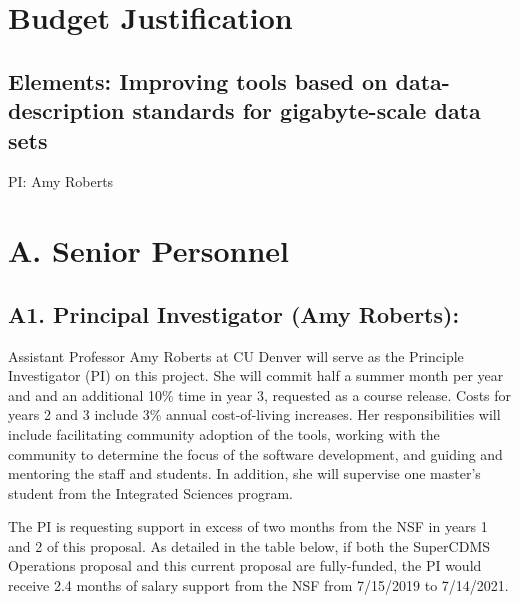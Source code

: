 \documentclass[11pt,oneside]{memoir}
\newcommand{\CDMS}{{\small CDMS}}
\begin{document}
\mainmatter
\pagestyle{bodystyle}

\section*{Budget Justification}
\subsection{Elements: Improving tools based on data-description standards for gigabyte-scale data sets}
\hspace{1cm}
\newline
PI: Amy Roberts


\section*{A. Senior Personnel}

\subsection*{A1. Principal Investigator (Amy Roberts):}

Assistant Professor Amy Roberts at CU Denver will serve as the Principle Investigator (PI) on this project.  She will commit half a summer month per year and and an additional 10\% time in year 3, requested as a course release. Costs for years 2 and 3 include 3\% annual cost-of-living increases. Her responsibilities will include facilitating community adoption of the tools, working with the community to determine the focus of the software development, and guiding and mentoring the staff and students.  In addition, she will supervise one master's student from the Integrated Sciences program.


The PI is requesting support in excess of two months from the NSF in years 1 and 2 of this proposal. As detailed in the table below, if both the SuperCDMS Operations proposal and this current proposal are fully-funded, the PI would receive 2.4 months of salary support from the NSF from 7/15/2019 to 7/14/2021.  
\end{document}
